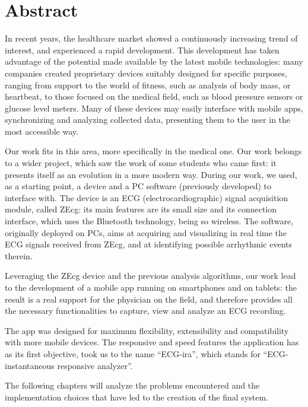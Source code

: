 \chapter{Abstract}

In recent years, the healthcare market showed a continuously increasing trend of interest, and experienced a rapid development. This development has taken advantage of the potential made available by the latest mobile technologies: many companies created proprietary devices suitably designed for specific purposes, ranging from support to the world of fitness, such as analysis of body mass, or heartbeat, to those focused on the medical field, such as blood pressure sensors or glucose level meters. Many of these devices may easily interface with mobile apps, synchronizing and analyzing collected data, presenting them to the user in the most accessible way.

Our work fits in this area, more specifically in the medical one. Our work belongs to a wider project, which saw the work of some students who came first: it presents itself as an evolution in a more modern way. During our work, we used, as a starting point, a device and a PC software (previously developed) to interface with. The device is an ECG (electrocardiographic) signal acquisition module, called ZEcg: its main features are its small size and its connection interface, which uses the Bluetooth technology, being so wireless.  The software, originally deployed on PCs, aims at acquiring and visualizing in real time the ECG signals received from ZEcg, and at identifying possible arrhythmic events therein.

Leveraging the ZEcg device and the previous analysis algorithms, our work lead to the development of a mobile app running on smartphones and on tablets: the result is a real support for the physician on the field, and therefore provides all the necessary functionalities to capture, view and analyze an ECG recording.

The app was designed for maximum flexibility, extensibility and compatibility with more mobile devices. The responsive and speed features the application has as its first objective, took us to the name ``ECG-ira'', which stands for ``ECG-instantaneous responsive analyzer''.

The following chapters will analyze the problems encountered and the implementation choices that have led to the creation of the final system.